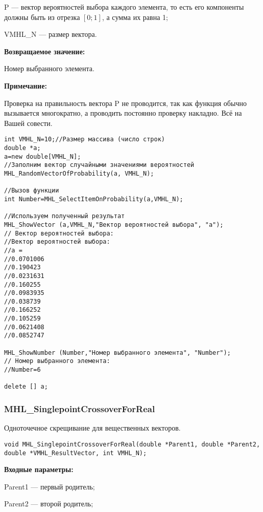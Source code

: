 \documentclass[a4paper,12pt]{article}
\begin{document}
 P --- вектор вероятностей выбора каждого элемента, то есть его компоненты должны быть из отрезка $[0;1]$, а сумма их равна 1;
 
 VMHL\_N --- размер вектора.

\textbf{Возвращаемое значение:} 

Номер выбранного элемента.

\textbf{Примечание:}

 Проверка на правильность вектора P не проводится, так как функция обычно вызывается многократно, а проводить постоянно проверку накладно. Всё на Вашей совести.



\begin{lstlisting}[label=code_use_MHL_SelectItemOnProbability,caption=Пример использования]
int VMHL_N=10;//Размер массива (число строк)
double *a;
a=new double[VMHL_N];
//Заполним вектор случайными значениями вероятностей
MHL_RandomVectorOfProbability(a, VMHL_N);

//Вызов функции
int Number=MHL_SelectItemOnProbability(a,VMHL_N);

//Используем полученный результат
MHL_ShowVector (a,VMHL_N,"Вектор вероятностей выбора", "a");
// Вектор вероятностей выбора:
//Вектор вероятностей выбора:
//a =
//0.0701006
//0.190423
//0.0231631
//0.160255
//0.0983935
//0.038739
//0.166252
//0.105259
//0.0621408
//0.0852747

MHL_ShowNumber (Number,"Номер выбранного элемента", "Number");
// Номер выбранного элемента:
//Number=6

delete [] a;
\end{lstlisting}

\subsubsection{MHL\_SinglepointCrossoverForReal}\label{MHL_SinglepointCrossoverForReal}

Одноточечное скрещивание для вещественных векторов.


\begin{lstlisting}[label=code_syntax_MHL_SinglepointCrossoverForReal,caption=Синтаксис]
void MHL_SinglepointCrossoverForReal(double *Parent1, double *Parent2, double *VMHL_ResultVector, int VMHL_N);
\end{lstlisting}

\textbf{Входные параметры:}
 
Parent1 --- первый родитель;
 
Parent2 --- второй родитель;
 
\end{document}
